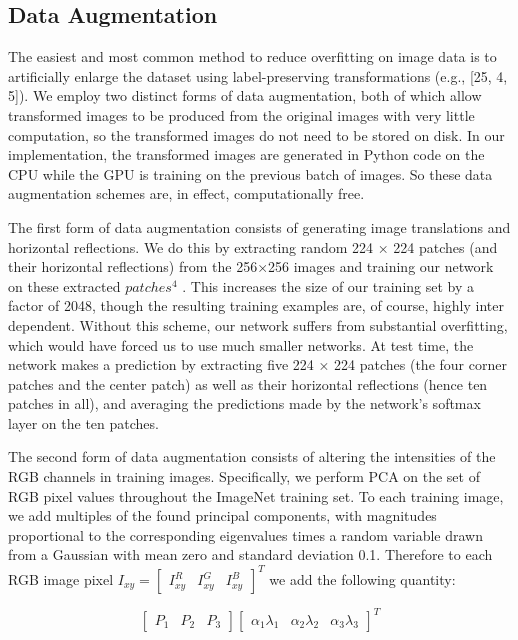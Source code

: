 \documentclass[12pt,a4paper,UTF8,twoside]{book}
\begin{document}
\hypertarget{data-augmentation}{%
\subsection{Data Augmentation}\label{data-augmentation}}

The easiest and most common method to reduce overfitting on image data is to artificially enlarge the dataset using label-preserving transformations (e.g., {[}25, 4, 5{]}). We employ two distinct forms of data augmentation, both of which allow transformed images to be produced from the original images with very little computation, so the transformed images do not need to be stored on disk. In our implementation, the transformed images are generated in Python code on the CPU while the GPU is training on the previous batch of images. So these data augmentation schemes are, in effect, computationally free.

The first form of data augmentation consists of generating image translations and horizontal reflections. We do this by extracting random 224 × 224 patches (and their horizontal reflections) from the 256×256 images and training our network on these extracted \(patches^4\) . This increases the size of our training set by a factor of 2048, though the resulting training examples are, of course, highly inter dependent. Without this scheme, our network suffers from substantial overfitting, which would have forced us to use much smaller networks. At test time, the network makes a prediction by extracting five 224 × 224 patches (the four corner patches and the center patch) as well as their horizontal reflections (hence ten patches in all), and averaging the predictions made by the network's softmax layer on the ten patches.

The second form of data augmentation consists of altering the intensities of the RGB channels in training images. Specifically, we perform PCA on the set of RGB pixel values throughout the ImageNet training set. To each training image, we add multiples of the found principal components, with magnitudes proportional to the corresponding eigenvalues times a random variable drawn from a Gaussian with mean zero and standard deviation 0.1. Therefore to each RGB image pixel \(I_{xy} = \left[ \begin{matrix} I^R_{xy} & I^G_{xy} & I^B_{xy} \end{matrix} \right]^T\) we add the following quantity:

\[
\left[ \begin{matrix} P_1 & P_2 & P_3 \end{matrix} \right]\left[ \begin{matrix} \alpha_1\lambda_1 & \alpha_2\lambda_2 & \alpha_3\lambda_3 \end{matrix} \right]^T
\]
\end{document}
